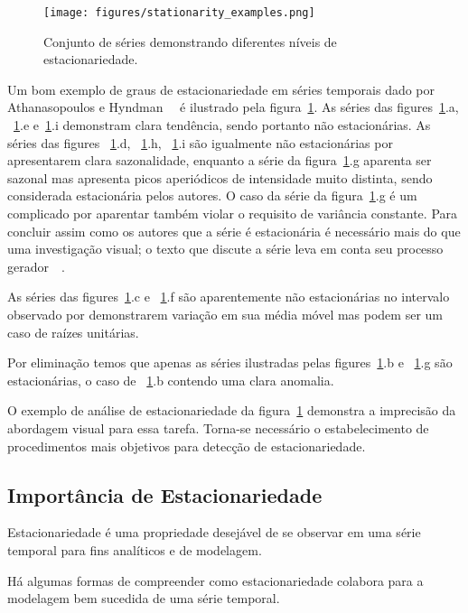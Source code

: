 \begin{figure}[h]
    \centering
    \texttt{[image: figures/stationarity\_examples.png]}
    \caption{Conjunto de séries demonstrando diferentes níveis de
    estacionariedade.}
    \label{fig:stationarity}
\end{figure}

Um bom exemplo de graus de estacionariedade em séries temporais dado por
Athanasopoulos e Hyndman~~\cite{athana} é ilustrado pela
figura~\ref{fig:stationarity}. As séries das figures~\ref{fig:stationarity}.a,
~\ref{fig:stationarity}.e e~\ref{fig:stationarity}.i demonstram clara
tendência, sendo portanto não estacionárias. As séries das figures
~\ref{fig:stationarity}.d, ~\ref{fig:stationarity}.h, ~\ref{fig:stationarity}.i
são igualmente não estacionárias por apresentarem clara sazonalidade, enquanto
a série da figura~\ref{fig:stationarity}.g aparenta ser sazonal mas apresenta
picos aperiódicos de intensidade muito distinta, sendo considerada estacionária
pelos autores. O caso da série da figura~\ref{fig:stationarity}.g é um
complicado por aparentar também violar o requisito de variância constante. Para
concluir assim como os autores que a série é estacionária é necessário mais do
que uma investigação visual; o texto que discute a série leva em conta seu
processo gerador~~\cite{athana}.

As séries das figures~\ref{fig:stationarity}.c e ~\ref{fig:stationarity}.f são
aparentemente não estacionárias no intervalo observado por demonstrarem
variação em sua média móvel mas podem ser um caso de raízes unitárias.

Por eliminação temos que apenas as séries ilustradas pelas
figures~\ref{fig:stationarity}.b e ~\ref{fig:stationarity}.g são estacionárias,
o caso de ~\ref{fig:stationarity}.b contendo uma clara anomalia.

O exemplo de análise de estacionariedade da figura~\ref{fig:stationarity}
demonstra a imprecisão da abordagem visual para essa tarefa. Torna-se
necessário o estabelecimento de procedimentos mais objetivos para detecção de
estacionariedade.

\subsection{Importância de Estacionariedade}

Estacionariedade é uma propriedade desejável de se observar em uma série
temporal para fins analíticos e de modelagem.

Há algumas formas de compreender como estacionariedade colabora para a
modelagem bem sucedida de uma série temporal.

